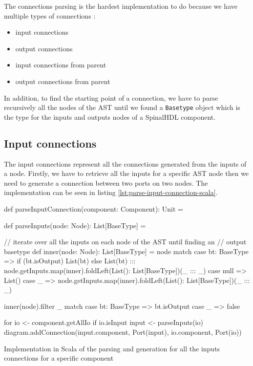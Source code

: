 The connections parsing is the hardest implementation to do because we
have multiple types of connections :
\begin{itemize}
\item input connections
\item output connections
\item input connections from parent
\item output connections from parent
\end{itemize}

In addition, to find the starting point of a connection, we have to parse
recursively all the nodes of the AST until we found a \verb|Basetype| object
which is the type for the inputs and outputs nodes of a SpinalHDL component.

\subsection{Input connections}
\label{sec:input-connections}

The input connections represent all the connections generated from the inputs of a
node. Firstly, we have to retrieve all the inputs for a specific AST node
then we need to generate a connection between two ports on two nodes. The
implementation can be seen in listing \ref{lst:parse-input-connection-scala}.

\begin{listing}[H]
  \centering
  \begin{scalacode}
  def parseInputConnection(component: Component): Unit = {
      
    def parseInputs(node: Node): List[BaseType] = {
      
      // iterate over all the inputs on each node of the AST until finding an
      // output basetype
      def inner(node: Node): List[BaseType] = node match {
        case bt: BaseType =>
          if (bt.isOutput) List(bt)
          else List(bt) ::: node.getInputs.map(inner).foldLeft(List(): List[BaseType])(_ ::: _)
        case null => List()
        case _ => node.getInputs.map(inner).foldLeft(List(): List[BaseType])(_ ::: _)
      }

      inner(node).filter {
        _ match {
          case bt: BaseType => bt.isOutput
          case _ => false
        }
      }
    }

    for {
      io <- component.getAllIo
      if io.isInput
      input <- parseInputs(io)
    } {
      diagram.addConnection(input.component, Port(input), io.component, Port(io))
    }
  }
  \end{scalacode}
  \caption[Parsing and generation of the inputs connections]{Implementation in
    Scala of the parsing and generation for all the inputs connections for a
    specific component}
  \label{lst:parse-input-connection-scala}
\end{listing}

